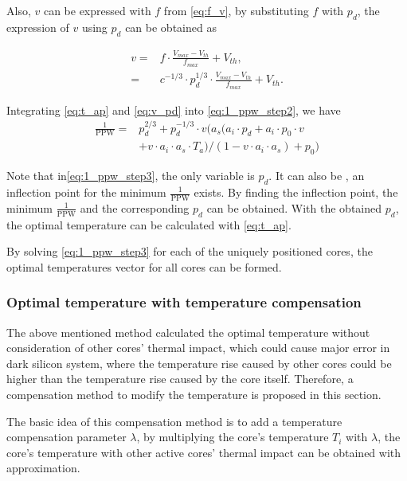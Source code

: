 Also, $v$ can be expressed with $f$ from \eqref{eq:f_v}, by substituting $f$ with $p_{d}$, the expression of $v$ using $p_{d}$ can be obtained as

\begin{equation}\label{eq:v_pd}
\begin{split}
v = &f\cdot \frac{V_{max}-V_{th}}{f_{max}}+V_{th},\\
=&c^{-1/3} \cdot p_{d}^{1/3}\cdot \frac{V_{max}-V_{th}}{f_{max}}+V_{th}.
\end{split}
\end{equation}

Integrating \eqref{eq:t_ap} and \eqref{eq:v_pd} into \eqref{eq:1_ppw_step2}, we have
\begin{equation}\label{eq:1_ppw_step3}
\begin{split}
\frac{1}{\text{PPW}} = &p_{d}^{2/3}+p_{d}^{-1/3}\cdot v(a_{s}(a_{i} \cdot p_{d}+a_{i} \cdot p_{0} \cdot v\\
 &+ v \cdot a_{i} \cdot a_{s} \cdot T_{a})/(1-v \cdot a_{i} \cdot a_{s})+p_{0})
\end{split}
\end{equation}

Note that in\eqref{eq:1_ppw_step3}, the only variable is $p_{d}$. It can also be , an inflection point for the minimum $\frac{1}{\text{PPW}}$ exists. By finding the inflection point, the minimum $\frac{1}{\text{PPW}}$ and the corresponding $p_{d}$ can be obtained. With the obtained $p_{d}$, the optimal temperature can be calculated with \eqref{eq:t_ap}.

By solving \eqref{eq:1_ppw_step3} for each of the uniquely positioned cores, the optimal temperatures vector for all cores can be formed.


\subsubsection{Optimal temperature with temperature compensation}

The above mentioned method calculated the optimal temperature without consideration of other cores' thermal impact, which could cause major error in dark silicon system, where the temperature rise caused by other cores could be higher than the temperature rise caused by the core itself. Therefore, a compensation method to modify the temperature is proposed in this section.

The basic idea of this compensation method is to add a temperature compensation parameter $\lambda$, by multiplying the core's temperature $T_{i}$ with $\lambda$, the core's temperature with other active cores' thermal impact can be obtained with approximation.


